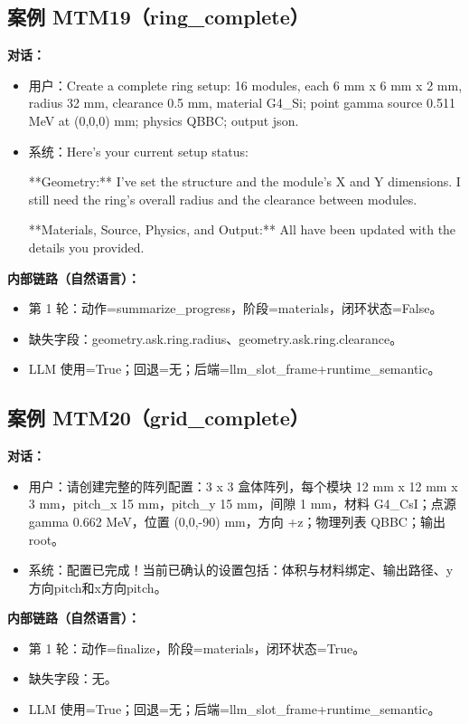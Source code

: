 \documentclass[11pt]{ctexart}
\begin{document}
\subsection{案例 MTM19（ring\_complete）}
\textbf{对话：}
\begin{itemize}
\item 用户：Create a complete ring setup: 16 modules, each 6 mm x 6 mm x 2 mm, radius 32 mm, clearance 0.5 mm, material G4\_Si; point gamma source 0.511 MeV at (0,0,0) mm; physics QBBC; output json.
\item 系统：Here's your current setup status:

**Geometry:** I've set the structure and the module's X and Y dimensions. I still need the ring's overall radius and the clearance between modules.

**Materials, Source, Physics, and Output:** All have been updated with the details you provided.
\end{itemize}
\textbf{内部链路（自然语言）：}
\begin{itemize}
\item 第 1 轮：动作=summarize\_progress，阶段=materials，闭环状态=False。
\item 缺失字段：geometry.ask.ring.radius、geometry.ask.ring.clearance。
\item LLM 使用=True；回退=无；后端=llm\_slot\_frame+runtime\_semantic。
\end{itemize}
\subsection{案例 MTM20（grid\_complete）}
\textbf{对话：}
\begin{itemize}
\item 用户：请创建完整的阵列配置：3 x 3 盒体阵列，每个模块 12 mm x 12 mm x 3 mm，pitch\_x 15 mm，pitch\_y 15 mm，间隙 1 mm，材料 G4\_CsI；点源 gamma 0.662 MeV，位置 (0,0,-90) mm，方向 +z；物理列表 QBBC；输出 root。
\item 系统：配置已完成！当前已确认的设置包括：体积与材料绑定、输出路径、y方向pitch和x方向pitch。
\end{itemize}
\textbf{内部链路（自然语言）：}
\begin{itemize}
\item 第 1 轮：动作=finalize，阶段=materials，闭环状态=True。
\item 缺失字段：无。
\item LLM 使用=True；回退=无；后端=llm\_slot\_frame+runtime\_semantic。
\end{itemize}
\end{document}
